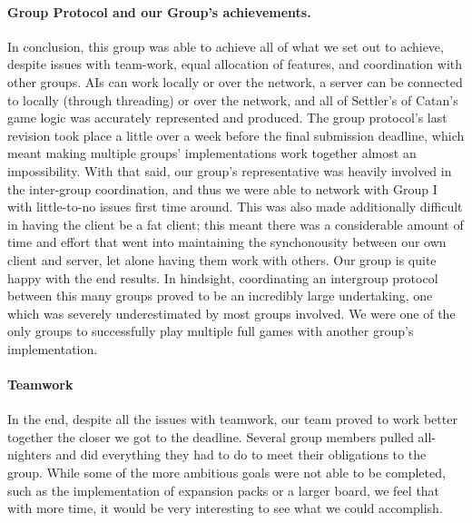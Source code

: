 \documentclass[a4paper,doc]{apa6}
\begin{document}
\paragraph{Group Protocol and our Group's achievements.}
In conclusion, this group was able to achieve all of what we set out to achieve, despite issues with team-work, equal allocation of features, and coordination with other groups. AIs can work locally or over the network, a server can be connected to locally (through threading) or over the network, and all of Settler's of Catan's game logic was accurately represented and produced. The group protocol's last revision took place a little over a week before the final submission deadline, which meant making multiple groups' implementations work together almost an impossibility. With that said, our group's representative was heavily involved in the inter-group coordination, and thus we were able to network with Group I with little-to-no issues first time around. This was also made additionally difficult in having the client be a fat client; this meant there was a considerable amount of time and effort that went into maintaining the synchonousity between our own client and server, let alone having them work with others. Our group is quite happy with the end results. In hindsight, coordinating an intergroup protocol between this many groups proved to be an incredibly large undertaking, one which was severely underestimated by most groups involved. We were one of the only groups to successfully play multiple full games with another group's implementation. 

\paragraph{Teamwork}
In the end, despite all the issues with teamwork, our team proved to work better together the closer we got to the deadline. Several group members pulled all-nighters and did everything they had to do to meet their obligations to the group. While some of the more ambitious goals were not able to be completed, such as the implementation of expansion packs or a larger board, we feel that with more time, it would be very interesting to see what we could accomplish.   
\end{document}
